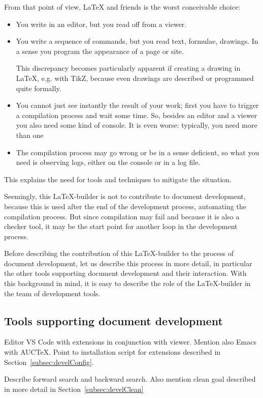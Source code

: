 From that point of view, \LaTeX{} and friends is the worst conceivable choice: 
%
\begin{itemize}
  \item
  You write in an editor, but you read off from a viewer. 
  \item
  You write a sequence of commands, but you read text, formulae, drawings. 
  In a sense you program the appearance of a page or site. 

  This discrepancy becomes particularly apparent if creating a drawing in \LaTeX, 
  e.g. with TikZ, because even drawings are described or programmed quite formally. 
  \item
  You cannot just see instantly the result of your work; 
  first you have to trigger a compilation process and wait some time. 
  So, besides an editor and a viewer you also need some kind of console. 
  It is even worse: typically, you need more than one 
  \item 
  The compilation process may go wrong or be in a sense deficient, 
  so what you need is observing logs, either on the console or in a log file. 
\end{itemize}

This explains the need for tools and techniques to mitigate the situation. 

Seemingly, this \LaTeX-builder is not to contribute to document development, 
because this is used after the end of the development process, 
automating the compilation process. 
But since compilation may fail and because it is also a checker tool, 
it may be the start point for another loop in the development process. 

Before describing the contribution of this \LaTeX-builder 
to the process of document development, 
let us describe this process in more detail, 
in particular the other tools supporting document development and their interaction. 
With this background in mind, it is easy to describe the role of the \LaTeX-builder 
in the team of development tools. 

\subsection{Tools supporting document development}

Editor VS Code with extensions in conjunction with viewer. 
Mention also Emacs with AUC\TeX. 
Point to installation script for extensions described in Section~\ref{subsec:develConfig}. 

Describe forward search and backward search. 
Also mention clean goal described in more detail in Section~\ref{subsec:develClean}

